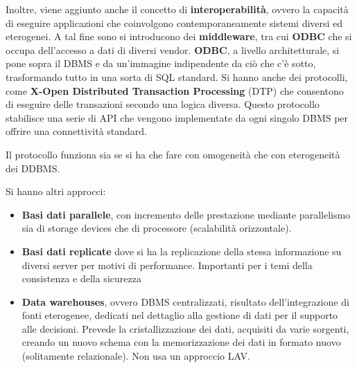 Inoltre, viene aggiunto anche il concetto di \textbf{interoperabilità}, ovvero
la capacità di eseguire applicazioni che coinvolgono contemporaneamente sistemi
diversi ed eterogenei. A tal fine sono si introducono dei \textbf{middleware},
tra cui \textbf{ODBC} che si occupa dell'accesso a dati di diversi vendor.
\textbf{ODBC}, a livello architetturale, si pone sopra il DBMS e da un'immagine
indipendente da ciò che c'è sotto, trasformando tutto in una sorta di SQL standard.
Si hanno anche dei protocolli, come \textbf{X-Open Distributed Transaction Processing}
(DTP) che consentono di eseguire delle transazioni secondo
una logica diversa. Questo protocollo stabilisce una serie di API che vengono
implementate da ogni singolo DBMS per offrire una connettività standard.

Il protocollo funziona sia se si ha che fare con omogeneità che con eterogeneità
dei DDBMS.


Si hanno altri approcci:
\begin{itemize}
      \item \textbf{Basi dati parallele}, con incremento delle prestazione
            mediante parallelismo sia di storage devices che di processore
            (scalabilità orizzontale).
      \item \textbf{Basi dati replicate} dove si ha la replicazione della stessa
            informazione su diversi server per motivi di performance. Importanti
            per i temi della consistenza e della sicurezza
      \item \textbf{Data warehouses}, ovvero DBMS centralizzati, risultato
            dell'integrazione di fonti eterogenee, dedicati nel dettaglio alla
            gestione di dati per il supporto alle decisioni. Prevede la
            cristallizzazione dei dati, acquisiti da varie sorgenti, creando un
            nuovo schema con la memorizzazione dei dati in formato nuovo
            (solitamente relazionale). Non usa un approccio LAV.
\end{itemize}
